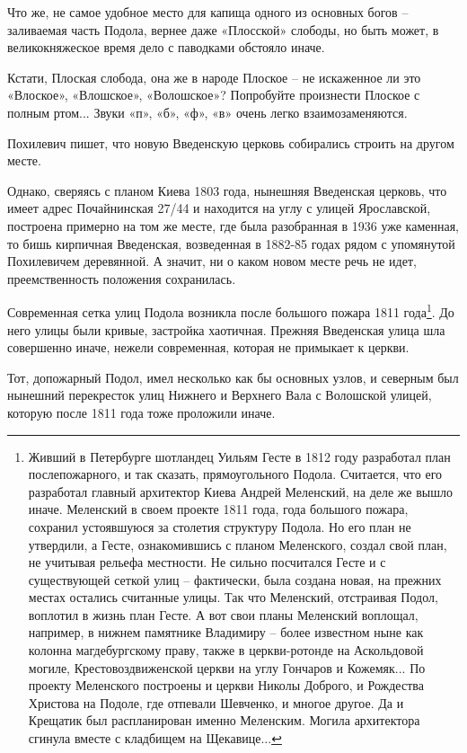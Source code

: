 Что же, не самое удобное место для капища одного из основных богов – заливаемая часть Подола, вернее даже «Плосской» слободы, но быть может, в великокняжеское время дело с паводками обстояло иначе.

Кстати, Плоская слобода, она же в народе Плоское – не искаженное ли это «Влоское», «Влошское», «Волошское»? Попробуйте произнести Плоское с полным ртом... Звуки «п», «б», «ф», «в» очень легко взаимозаменяются.

Похилевич пишет, что новую Введенскую церковь собирались строить на другом месте.

Однако, сверяясь с планом Киева 1803 года,
нынешняя Введенская церковь, что имеет адрес Почайнинская 27/44 и находится на углу с улицей Ярославской, построена примерно на том же месте, где была разобранная в 1936 уже каменная, то бишь кирпичная Введенская, возведенная в 1882-85 годах рядом с упомянутой Похилевичем деревянной. А значит, ни о каком новом месте речь не идет, 
преемственность положения сохранилась.

Современная сетка улиц Подола возникла после большого пожара 1811 года\footnote{Живший в Петербурге шотландец Уильям Гесте в 1812 году разработал план послепожарного, и так сказать, прямоугольного Подола. Считается, что его разработал главный архитектор Киева Андрей Меленский, на деле же вышло иначе. Меленский в своем проекте 1811 года, года большого пожара, сохранил устоявшуюся за столетия структуру Подола. Но его план не утвердили, а Гесте, ознакомившись с планом Меленского, создал свой план, не учитывая рельефа местности. Не сильно посчитался Гесте и с существующей сеткой улиц – фактически, была создана новая, на прежних местах остались считанные улицы. Так что Меленский, отстраивая Подол, воплотил в жизнь план Гесте. А вот свои планы Меленский воплощал, например, в нижнем памятнике Владимиру – более известном ныне как колонна магдебургскому праву, также в церкви-ротонде на Аскольдовой могиле, Крестовоздвиженской церкви на углу Гончаров и Кожемяк... По проекту Меленского построены и церкви Николы Доброго, и Рождества Христова на Подоле, где отпевали Шевченко, и многое другое. Да и Крещатик был распланирован именно Меленским. Могила архитектора сгинула вместе с кладбищем на Щекавице...}. До него улицы были кривые, застройка хаотичная. Прежняя Введенская улица шла совершенно иначе, нежели современная, которая не примыкает к церкви.

Тот, допожарный Подол, имел несколько как бы основных узлов, и северным был нынешний перекресток улиц Нижнего и Верхнего Вала с Волошской улицей, которую после 1811 года тоже проложили иначе. 

